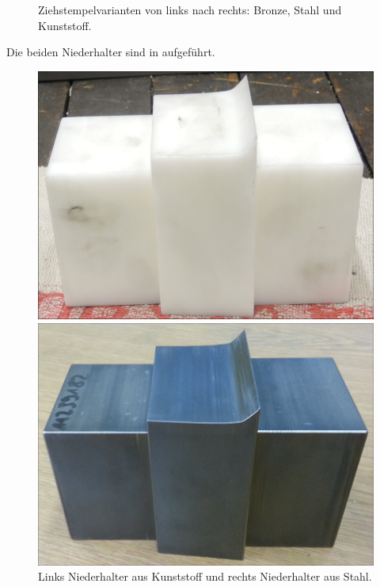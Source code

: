 \documentclass[12pt,a4paper,parskip,twoside,BCOR5mm,headsepline]{scrartcl}
\begin{document}
\begin{description*}
\begin{figure}[H]
\begin{minipage} [t]{0.329\textwidth}
\end{minipage}
\caption{Ziehstempelvarianten von links nach rechts: Bronze, Stahl und Kunststoff.}
\label{fig:punchvar}
\end{figure}

Die beiden Niederhalter sind in  aufgeführt.





\begin{figure}[H]
\centering
\begin{minipage}[t]{0.45\textwidth}
\includegraphics[width=.93\textwidth]{niederhalterkunst}
\end{minipage}
\begin{minipage}[t]{0.45\textwidth}
\includegraphics[width=.95\textwidth]{niederhalterS}
\end{minipage}
\caption{ Links Niederhalter aus Kunststoff und rechts Niederhalter aus Stahl.}
\label{fig:nied}
\end{figure}
\newpage

\end{description*}
\end{document}
